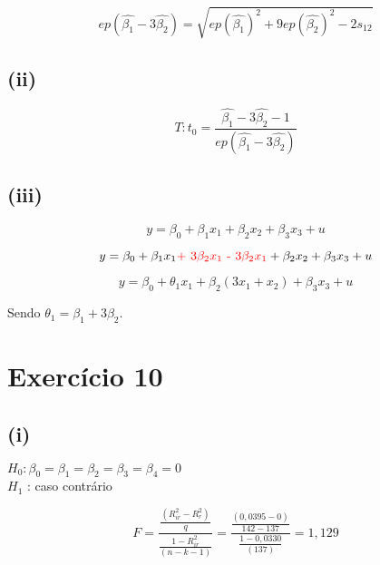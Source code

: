 \documentclass[hidelinks,11pt]{book}
\theoremstyle{definition}
\begin{document}
\begin{displaymath}
	ep (\hat{\beta_1} - 3\hat{\beta_2}) = \sqrt{ep(\hat{\beta_1})^2 + 9 ep(\hat{\beta_2})^2 -  2s_{12}}
\end{displaymath}

\subsection*{(ii)}

\begin{displaymath}
	T: t_0 = \frac{\hat{\beta_1} - 3\hat{\beta_2} - 1}  {ep (\hat{\beta_1} - 3\hat{\beta_2})}
\end{displaymath}

\subsection*{(iii)}

\begin{displaymath}
y = \beta_0 + \beta_1 x_1 + \beta_2 x_2 + \beta_3 x_3 + u
\end{displaymath}

\begin{displaymath}
	y = \beta_0 + \beta_1 x_1 \textrm{\textcolor{red}{ + $3\beta_2 x_1$ -  $3\beta_2 x_1$}} + \beta_2 x_2 + \beta_3 x_3 + u
\end{displaymath}

\begin{displaymath}
	y = \beta_0 + \theta_1 x_1 + \beta_2 (3x_1 + x_2) + \beta_3 x_3 + u
\end{displaymath}

Sendo $\theta_1 = \beta_1 + 3\beta_2$.

\section*{Exercício 10}
	
\subsection*{(i)}

\begin{center}
	$H_0 : \beta_0 = \beta_1 = \beta_{2} =  \beta_3 = \beta_4 = 0$\\
	$H_1$ : caso contrário
\end{center}
	
\begin{displaymath}
	F = \frac{\frac{(R^{2}_{ir} - R^{2}_{r})}{q}}    {\frac{1 - R^{2}_{ir}}{(n-k-1)}} = \frac{\frac{(0,0395 - 0)}{142 - 137}}    {\frac{1 - 0,0330}{(137)}} = 1,129
\end{displaymath}
\end{document}
